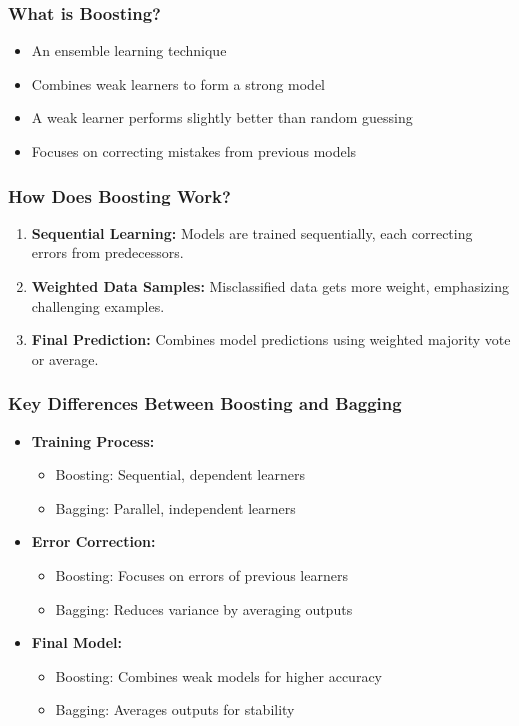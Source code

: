 \documentclass[aspectratio=169]{beamer}
\begin{document}
\begin{frame}[fragile]
    \frametitle{What is Boosting?}
    \begin{itemize}
        \item An ensemble learning technique
        \item Combines weak learners to form a strong model
        \item A weak learner performs slightly better than random guessing
        \item Focuses on correcting mistakes from previous models
    \end{itemize}
\end{frame}

\begin{frame}[fragile]
    \frametitle{How Does Boosting Work?}
    \begin{enumerate}
        \item \textbf{Sequential Learning:} Models are trained sequentially, each correcting errors from predecessors.
        \item \textbf{Weighted Data Samples:} Misclassified data gets more weight, emphasizing challenging examples.
        \item \textbf{Final Prediction:} Combines model predictions using weighted majority vote or average.
    \end{enumerate}
\end{frame}

\begin{frame}[fragile]
    \frametitle{Key Differences Between Boosting and Bagging}
    \begin{itemize}
        \item \textbf{Training Process:} 
            \begin{itemize}
                \item Boosting: Sequential, dependent learners
                \item Bagging: Parallel, independent learners
            \end{itemize}
        \item \textbf{Error Correction:} 
            \begin{itemize}
                \item Boosting: Focuses on errors of previous learners
                \item Bagging: Reduces variance by averaging outputs
            \end{itemize}
        \item \textbf{Final Model:} 
            \begin{itemize}
                \item Boosting: Combines weak models for higher accuracy
                \item Bagging: Averages outputs for stability
            \end{itemize}
    \end{itemize}
\end{frame}
\end{document}
